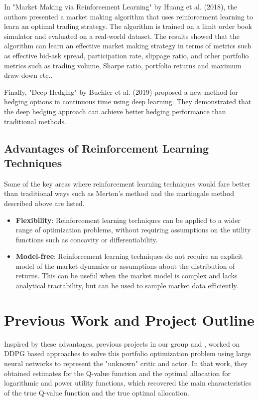 In "Market Making via Reinforcement Learning" by Huang et al. (2018),\cite{huang2018market} the authors presented a market making algorithm that uses reinforcement learning to learn an optimal trading strategy. The algorithm is trained on a limit order book simulator and evaluated on a real-world dataset. The results showed that the algorithm can learn an effective market making strategy in terms of metrics such as effective bid-ask spread, participation rate, slippage ratio, and other portfolio metrics such as trading volume, Sharpe ratio, portfolio returns and maximum draw down etc..

Finally, "Deep Hedging" by Buehler et al. (2019) \cite{buehler2019deep} proposed a new method for hedging options in continuous time using deep learning. They demonstrated that the deep hedging approach can achieve better hedging performance than traditional methods.

\subsection{Advantages of Reinforcement Learning Techniques}
Some of the key areas where reinforcement learning techniques would fare better than traditional ways such as Merton's method and the martingale method described above are listed.
\begin{itemize}
    \item \textbf{Flexibility}: Reinforcement learning techniques can be applied to a wider range of optimization problems, without requiring assumptions on the utility functions such as concavity or differentiability.
    \item \textbf{Model-free}: Reinforcement learning techniques do not require an explicit model of the market dynamics or assumptions about the distribution of returns. This can be useful when the market model is complex and lacks analytical tractability, but can be used to sample market data efficiently.
    
   
\end{itemize}
\section{Previous Work and Project Outline}
Inspired by these advantages, previous projects in our group \cite{Janik2022} and \cite{RL_ArtInt_268}, worked on DDPG based approaches to solve this portfolio optimization problem using large neural networks to represent the "unknown" critic and actor. In that work, they obtained estimates for the Q-value function and the optimal allocation for logarithmic and power utility functions, which recovered the main characteristics of the true Q-value function and the true optimal allocation. 

